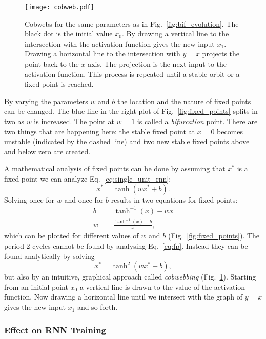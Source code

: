 \begin{figure}
  \centering
  \texttt{[image: cobweb.pdf]}
  \caption{Cobwebs for the same parameters as in Fig.~\ref{fig:bif_evolution}.
    The black dot is the initial value $x_0$. By drawing a vertical line to the
    intersection with the activation function gives the new input $x_1$. Drawing
    a horizontal line to the intersection with $y = x$ projects the point back to
    the $x$-axis.  The projection is the next input to the activation function.
    This process is repeated until a stable orbit or a fixed point is reached.}
  \label{fig:cobweb}
\end{figure}



By varying the parameters $w$ and $b$ the location and the nature of fixed
points can be changed. The blue line in the right plot of
Fig.~\ref{fig:fixed_points} splits in two as $w$ is increased. The point at
$w=1$ is called a \emph{bifurcation} point.  There are two things that are
happening here: the stable fixed point at $x=0$ becomes unstable (indicated by
the dashed line) and two new stable fixed points above and below zero are
created.

A mathematical analysis of fixed points can be done by assuming that $x^*$ is a
fixed point we can analyze Eq.~\ref{eq:single_unit_rnn}:
\begin{equation}
  \label{eq:fp}
  x^* = \tanh(wx^* +b).
\end{equation}
Solving once for $w$ and once for $b$ results in two equations for fixed
points:
\begin{align}
  b &= \tanh^{-1}(x) - wx\\
  w &= \frac{\tanh^{-1}(x) - b}{x},
\end{align}
which can be plotted for different values of $w$ and $b$
(Fig.~\ref{fig:fixed_points}).  The period-2 cycles cannot be found by
analysing Eq.~\ref{eq:fp}.  Instead they can be found analytically by solving
\begin{equation}
  x^* = \tanh^2(wx^* + b),
\end{equation}
but also by an intuitive, graphical approach called \emph{cobwebbing} (Fig.~\ref{fig:cobweb}).
Starting from an initial point $x_0$ a vertical line is drawn to the value of
the activation function. Now drawing a horizontal line until we intersect with
the graph of $y = x$ gives the new input $x_1$ and so forth.

\subsubsection{Effect on RNN Training}%
\label{ssub:effect_on_rnn_training}


